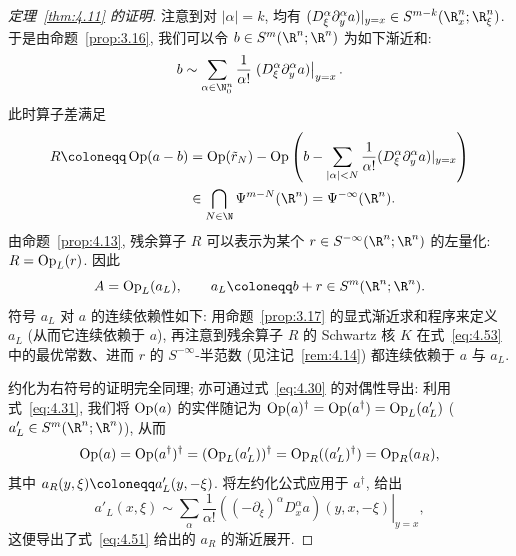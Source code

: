 \begin{proof}[定理~\ref{thm:4.11} 的证明]
注意到对 $|\alpha| = k$, 均有 $(D_\xi^\alpha \partial_y^\alpha a)|_{y=x} \in S^{m-k}(\R_x^n; \R_\xi^n)$. 于是由命题~\ref{prop:3.16}, 我们可以令 $b \in S^m(\R^n; \R^n)$ 为如下渐近和:
\begin{equation}\label{eq:4.65}
    b \sim \sum_{\alpha \in \N_0^n} \frac{1}{\alpha!} \left. (D_\xi^\alpha \partial_y^\alpha a) \right|_{y = x}.
\end{equation}
此时算子差满足
\begin{equation}\label{eq:4.66}
    \begin{aligned}
        R \defeq \Op(a - b) &= \Op(\tilde{r}_N) - \Op\left( b - \sum_{|\alpha| < N} \frac{1}{\alpha!} (D_\xi^\alpha \partial_y^\alpha a)|_{y=x} \right) \\
        &\in \bigcap_{N \in \N} \Psi^{m-N}(\R^n) = \Psi^{-\infty}(\R^n).
    \end{aligned}
\end{equation}
由命题~\ref{prop:4.13}, 残余算子 $R$ 可以表示为某个 $r \in S^{-\infty}(\R^n; \R^n)$ 的左量化: $R = \operatorname{Op}_L(r)$. 因此
\begin{equation}\label{eq:4.67}
    A = \Op_L(a_L), \qquad a_L \defeq b + r \in S^m(\R^n; \R^n).
\end{equation}
符号 $a_L$ 对 $a$ 的连续依赖性如下: 用命题~\ref{prop:3.17} 的显式渐近求和程序来定义 $a_L$ (从而它连续依赖于 $a$), 再注意到残余算子 $R$ 的 Schwartz 核 $K$ 在式~\eqref{eq:4.53} 中的最优常数、进而 $r$ 的 $S^{-\infty}$-半范数 (见注记~\ref{rem:4.14}) 都连续依赖于 $a$ 与 $a_L$.

约化为右符号的证明完全同理; 亦可通过式~\eqref{eq:4.30} 的对偶性导出: 利用式~\eqref{eq:4.31}, 我们将 $\operatorname{Op}(a)$ 的实伴随记为 $\operatorname{Op}(a)^\dag = \operatorname{Op}(a^\dag) = \operatorname{Op}_L(a'_L)$ ($a'_L \in S^m(\R^n; \R^n)$), 从而
\begin{equation}\label{eq:4.68}
    \operatorname{Op}(a) = \operatorname{Op}(a^\dag)^\dag = (\operatorname{Op}_L(a'_L))^\dag = \operatorname{Op}_R((a'_L)^\dag) = \operatorname{Op}_R(a_R),
\end{equation}
其中 $a_R(y, \xi) \defeq a'_L(y, -\xi)$. 将左约化公式应用于 $a^\dag$, 给出
\begin{equation}\label{eq:4.69}
    a'_L(x, \xi) \sim \sum_\alpha \frac{1}{\alpha!} \left. ((-\partial_\xi)^\alpha D_x^\alpha a)(y, x, -\xi) \right|_{y=x},
\end{equation}
这便导出了式~\eqref{eq:4.51} 给出的 $a_R$ 的渐近展开.


\end{proof}
